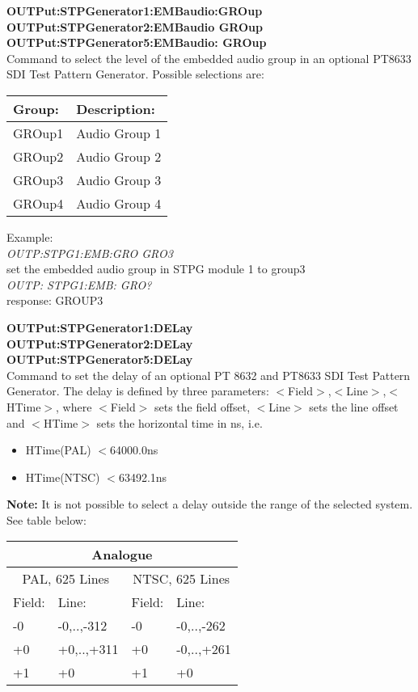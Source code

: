\textbf{OUTPut:STPGenerator1:EMBaudio:GROup}\\
\textbf{OUTPut:STPGenerator2:EMBaudio GROup}\\
\textbf{OUTPut:STPGenerator5:EMBaudio: GROup}\\
Command to select the level of the embedded audio group in an optional PT8633 SDI Test Pattern Generator. Possible selections are:

\begin{tabular}{|l|l|}
\hline
Group:		& Description: \\ \hline
GROup1		& Audio Group 1\\ \hline
GROup2		& Audio Group 2\\ \hline
GROup3		& Audio Group 3\\ \hline
GROup4		& Audio Group 4\\ \hline
\end{tabular}

Example:\\
\textit{OUTP:STPG1:EMB:GRO GRO3}\\
set the embedded audio group in STPG module 1 to group3\\
\textit{OUTP: STPG1:EMB: GRO?}\\
response: GROUP3

\textbf{OUTPut:STPGenerator1:DELay}\\
\textbf{OUTPut:STPGenerator2:DELay}\\
\textbf{OUTPut:STPGenerator5:DELay}\\
Command to set the delay of an optional PT 8632 and PT8633 SDI Test Pattern Generator. The delay is defined by three parameters:
$<$Field$>$,$<$Line$>$,$<$HTime$>$, where $<$Field$>$ sets the field offset, $<$Line$>$ sets the line offset and $<$HTime$>$ sets the horizontal time in ns, i.e.
\begin{itemize}
\item HTime(PAL) $<$64000.0ns
\item HTime(NTSC) $<$63492.1ns
\end{itemize}

\textbf{Note:} It is not possible to select a delay outside the range of the selected system. See table below:

\begin{tabular}{|p{5em}|p{5em}|p{5em}|p{5em}|}
\hline
\multicolumn{4}{|c|}{Analogue} \\ 
\hline
\multicolumn{2}{|c|}{PAL, 625 Lines} & \multicolumn{2}{|c|}{NTSC, 625 Lines} \\ 
\hline
Field: 	& Line: 			& Field: 				& Line: 			\\ \hline
-0			& -0,..,-312	& -0						& -0,..,-262\\ \hline
+0			& +0,..,+311	& +0						& -0,..,+261\\ \hline
+1			& +0					& +1						& +0\\ \hline
\end{tabular}

